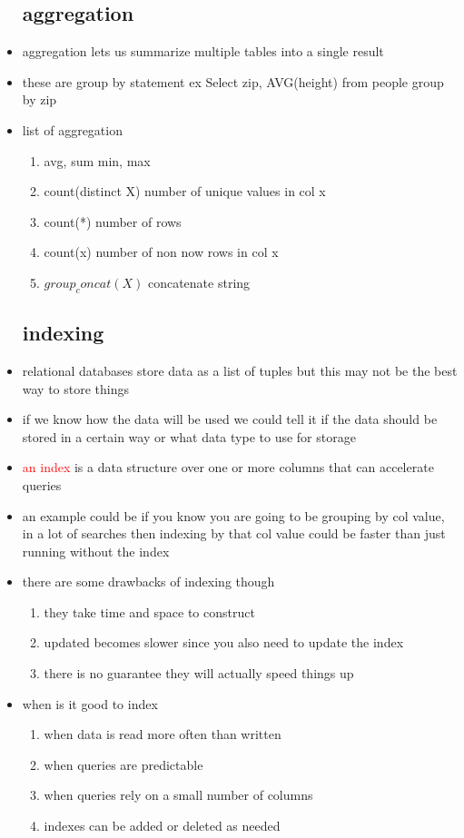 \documentclass{article}
\begin{document}
\begin{itemize}
\subsection*{aggregation}
\item aggregation lets us summarize multiple tables into a single result 
\item these are group by statement ex Select zip, AVG(height) from people group by zip
\item list of aggregation 
\begin{enumerate}
    \item avg, sum min, max
    \item count(distinct X) number of unique values in col x 
    \item count(*) number of rows 
    \item count(x) number of non now rows in col x 
    \item $group_concat(X)$ concatenate string  
\end{enumerate}
\subsection*{ indexing}
\item relational databases store data as a list of tuples but this may not be the best way to store things 
\item if we know how the data will be used we could tell it if the data should be stored in a certain way or what data type to use for storage
\item \textcolor{red}{an index} is a data structure over one or more columns that can accelerate queries
\item an example could be if you know you are going to be grouping by col value, in a lot of searches then indexing by that col value could be faster than just running without the index
\item there are some drawbacks of indexing though 
\begin{enumerate}
    \item they take time and space to construct 
    \item updated becomes slower since you also need to update the index 
    \item there is no guarantee they will actually speed things up
\end{enumerate}
\item when is it good to index
\begin{enumerate}
    \item when data is read more often than written 
    \item when queries are predictable 
    \item when queries rely on a small number of columns
    \item indexes can be added or deleted as needed 
\end{enumerate}

\end{itemize}
\end{document}
